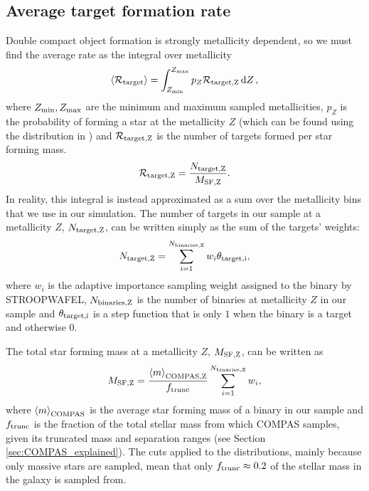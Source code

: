 \subsection{Average target formation rate}
Double compact object formation is strongly metallicity dependent, so we must find the average rate as the integral over metallicity
\begin{equation}\label{eq:norm_avg_target_formation}
    \avg{ \mathcal{R}_{\rm target} } = \int_{Z_{\rm min}}^{Z_{\rm max}} p_{Z} \mathcal{R}_{\rm target, Z} \dd{Z},
\end{equation}
where $Z_{\rm min}, Z_{\rm max}$ are the minimum and maximum sampled metallicities, $p_Z$ is the probability of forming a star at the metallicity $Z$ (which can be found using the distribution in \citealp{Frankel+2018}) and $\mathcal{R}_{\rm target, Z}$ is the number of targets formed per star forming mass.
\begin{equation}
    \mathcal{R}_{\rm target, Z} =  \frac{N_{\rm target, Z}}{ M_{\rm SF, Z} }.
\end{equation}
In reality, this integral is instead approximated as a sum over the metallicity bins that we use in our simulation. The number of targets in our sample at a metallicity $Z$, $N_{\rm target, Z}$, can be written simply as the sum of the targets' weights:
\begin{equation}
    N_{\rm target, Z} = \sum_{i=1}^{N_{\rm binaries, Z}} w_i \theta_{\rm target, i},
\end{equation}
where $w_i$ is the adaptive importance sampling weight assigned to the binary by STROOPWAFEL, $N_{\rm binaries, Z}$ is the number of binaries at metallicity $Z$ in our sample and $\theta_{\rm target, i}$ is a step function that is only $1$ when the binary is a target and otherwise $0$.

The total star forming mass at a metallicity $Z$, $M_{\rm SF, Z}$, can be written as
\begin{equation}
    M_{\rm SF, Z} = \frac{\avg{m}_{\rm COMPAS, Z}}{f_{\rm trunc}} \sum_{i=1}^{N_{\rm binaries, Z}} w_i,
\end{equation}
where $\left\langle m\right\rangle_{\rm COMPAS}$ is the average star forming mass of a binary in our sample and $f_{\rm trunc}$ is the fraction of the total stellar mass from which COMPAS samples, given its truncated mass and separation ranges (see Section \ref{sec:COMPAS_explained}). The cuts applied to the distributions, mainly because only massive stars are sampled, mean that only $f_{\rm trunc} \approx 0.2$ of the stellar mass in the galaxy is sampled from.

